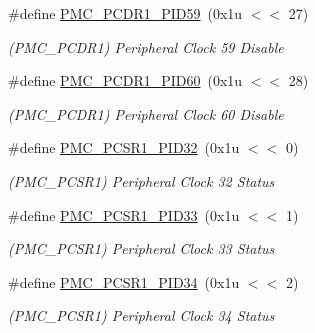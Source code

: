 \begin{DoxyCompactItemize}
\mbox{\label{group__SAMS70__PMC_ga644853bb7606a41cfa75dabbddd0b322}} 
\#define \mbox{\hyperlink{group__SAMS70__PMC_ga644853bb7606a41cfa75dabbddd0b322}{P\+M\+C\+\_\+\+P\+C\+D\+R1\+\_\+\+P\+I\+D59}}~(0x1u $<$$<$ 27)
\begin{DoxyCompactList}\small\item\em (P\+M\+C\+\_\+\+P\+C\+D\+R1) Peripheral Clock 59 Disable \end{DoxyCompactList}\item 
\mbox{\label{group__SAMS70__PMC_gae56a89ab61dd2b17093818fb910ae4cb}} 
\#define \mbox{\hyperlink{group__SAMS70__PMC_gae56a89ab61dd2b17093818fb910ae4cb}{P\+M\+C\+\_\+\+P\+C\+D\+R1\+\_\+\+P\+I\+D60}}~(0x1u $<$$<$ 28)
\begin{DoxyCompactList}\small\item\em (P\+M\+C\+\_\+\+P\+C\+D\+R1) Peripheral Clock 60 Disable \end{DoxyCompactList}\item 
\mbox{\label{group__SAMS70__PMC_gac91dd4748028ff9dad647ff84b3acbbc}} 
\#define \mbox{\hyperlink{group__SAMS70__PMC_gac91dd4748028ff9dad647ff84b3acbbc}{P\+M\+C\+\_\+\+P\+C\+S\+R1\+\_\+\+P\+I\+D32}}~(0x1u $<$$<$ 0)
\begin{DoxyCompactList}\small\item\em (P\+M\+C\+\_\+\+P\+C\+S\+R1) Peripheral Clock 32 Status \end{DoxyCompactList}\item 
\mbox{\label{group__SAMS70__PMC_gaeff1666f3a8f372b6af6bc8af62dacc6}} 
\#define \mbox{\hyperlink{group__SAMS70__PMC_gaeff1666f3a8f372b6af6bc8af62dacc6}{P\+M\+C\+\_\+\+P\+C\+S\+R1\+\_\+\+P\+I\+D33}}~(0x1u $<$$<$ 1)
\begin{DoxyCompactList}\small\item\em (P\+M\+C\+\_\+\+P\+C\+S\+R1) Peripheral Clock 33 Status \end{DoxyCompactList}\item 
\mbox{\label{group__SAMS70__PMC_ga8fe23cc1946583f4a447c6299cc61288}} 
\#define \mbox{\hyperlink{group__SAMS70__PMC_ga8fe23cc1946583f4a447c6299cc61288}{P\+M\+C\+\_\+\+P\+C\+S\+R1\+\_\+\+P\+I\+D34}}~(0x1u $<$$<$ 2)
\begin{DoxyCompactList}\small\item\em (P\+M\+C\+\_\+\+P\+C\+S\+R1) Peripheral Clock 34 Status \end{DoxyCompactList}\item 
$$
\end{DoxyCompactItemize}
